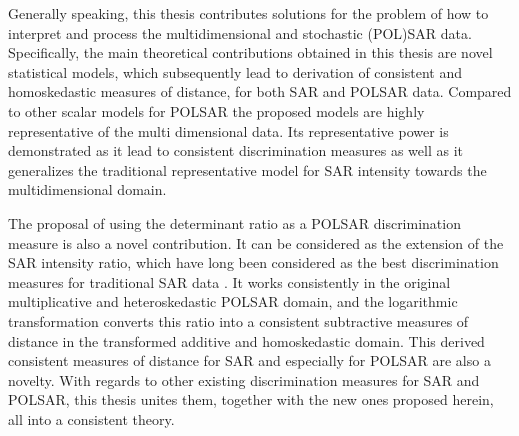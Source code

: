 Generally speaking, this thesis contributes solutions for the problem of how to interpret and process the multidimensional and stochastic (POL)SAR data.
Specifically, the
                main theoretical contributions obtained in this thesis are novel statistical
                models, which subsequently lead to derivation of
                consistent and homoskedastic measures of distance, for
                both SAR and POLSAR data.
Compared
                to other scalar models for POLSAR the proposed models
                are highly representative of the multi dimensional data.
Its
                representative power is demonstrated as it lead to
                consistent discrimination measures as well as it
                generalizes the traditional representative model for SAR
                intensity towards the multidimensional domain.

The proposal of using the determinant ratio as a POLSAR discrimination measure is also a novel contribution.
It can be considered as the extension of the SAR intensity ratio,
  which have long been considered as the best discrimination measures for traditional SAR data \cite{Rignot_1993_TGRS_896}.
It works consistently in the original multiplicative and heteroskedastic POLSAR domain,
  and the logarithmic transformation converts this ratio into a consistent subtractive measures of distance in the transformed additive and homoskedastic domain.
This
                derived consistent measures of distance for SAR and
                especially for POLSAR are also a novelty.
With regards to other existing discrimination measures for SAR and POLSAR,
                this thesis unites them, together with the new ones
                proposed herein, all into a consistent theory.

